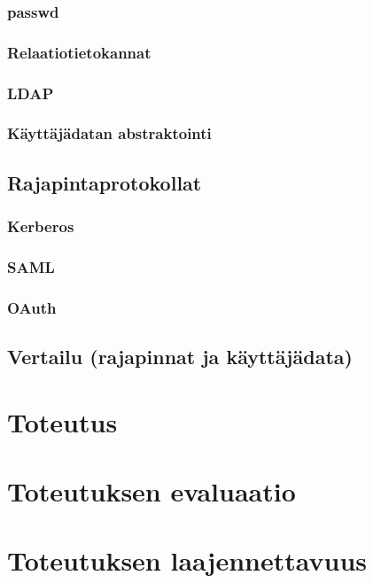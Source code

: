 \documentclass{tktltiki}
\begin{document}
\subsubsection{passwd}

\subsubsection{Relaatiotietokannat}

\subsubsection{LDAP}

\subsubsection{Käyttäjädatan abstraktointi}

\subsection{Rajapintaprotokollat}

\subsubsection{Kerberos}

\subsubsection{SAML}

\subsubsection{OAuth}

\subsection{Vertailu (rajapinnat ja käyttäjädata)}

\section{Toteutus}
\section{Toteutuksen evaluaatio}
\section{Toteutuksen laajennettavuus}
\end{document}
